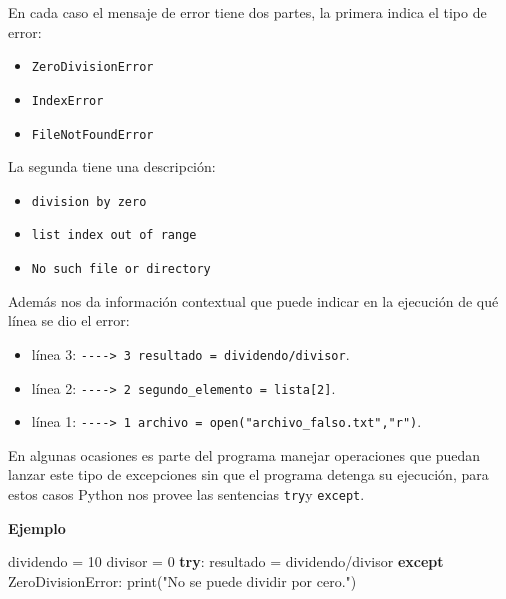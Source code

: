\documentclass[
  letterpaper,
  DIV=11,
  numbers=noendperiod]{scrreprt}
\newenvironment{Shaded}{\begin{snugshade}}{\end{snugshade}}
\newcommand{\BuiltInTok}[1]{\textcolor[rgb]{0.00,0.23,0.31}{#1}}
\newcommand{\ControlFlowTok}[1]{\textcolor[rgb]{0.00,0.23,0.31}{\textbf{#1}}}
\newcommand{\DecValTok}[1]{\textcolor[rgb]{0.68,0.00,0.00}{#1}}
\newcommand{\NormalTok}[1]{\textcolor[rgb]{0.00,0.23,0.31}{#1}}
\newcommand{\OperatorTok}[1]{\textcolor[rgb]{0.37,0.37,0.37}{#1}}
\newcommand{\PreprocessorTok}[1]{\textcolor[rgb]{0.68,0.00,0.00}{#1}}
\newcommand{\StringTok}[1]{\textcolor[rgb]{0.13,0.47,0.30}{#1}}
\providecommand{\tightlist}{%
  \setlength{\itemsep}{0pt}\setlength{\parskip}{0pt}}\usepackage{longtable,booktabs,array}
\begin{document}
En cada caso el mensaje de error tiene dos partes, la primera indica el
tipo de error:

\begin{itemize}
\tightlist
\item
  \texttt{ZeroDivisionError}
\item
  \texttt{IndexError}
\item
  \texttt{FileNotFoundError}
\end{itemize}

La segunda tiene una descripción:

\begin{itemize}
\tightlist
\item
  \texttt{division\ by\ zero}
\item
  \texttt{list\ index\ out\ of\ range}
\item
  \texttt{No\ such\ file\ or\ directory}
\end{itemize}

Además nos da información contextual que puede indicar en la ejecución
de qué línea se dio el error:

\begin{itemize}
\tightlist
\item
  línea 3:
  \texttt{-\/-\/-\/-\textgreater{}\ 3\ resultado\ =\ dividendo/divisor}.
\item
  línea 2:
  \texttt{-\/-\/-\/-\textgreater{}\ 2\ segundo\_elemento\ =\ lista{[}2{]}}.
\item
  línea 1:
  \texttt{-\/-\/-\/-\textgreater{}\ 1\ archivo\ =\ open("archivo\_falso.txt","r")}.
\end{itemize}

En algunas ocasiones es parte del programa manejar operaciones que
puedan lanzar este tipo de excepciones sin que el programa detenga su
ejecución, para estos casos Python nos provee las sentencias
\texttt{try}y \texttt{except}.

\textbf{Ejemplo}

\begin{Shaded}
\begin{Highlighting}[]
\NormalTok{dividendo }\OperatorTok{=} \DecValTok{10}
\NormalTok{divisor }\OperatorTok{=} \DecValTok{0}
\ControlFlowTok{try}\NormalTok{:}
\NormalTok{  resultado }\OperatorTok{=}\NormalTok{ dividendo}\OperatorTok{/}\NormalTok{divisor }
\ControlFlowTok{except} \PreprocessorTok{ZeroDivisionError}\NormalTok{:}
  \BuiltInTok{print}\NormalTok{(}\StringTok{"No se puede dividir por cero."}\NormalTok{)}
\end{Highlighting}
\end{Shaded}
\end{document}
